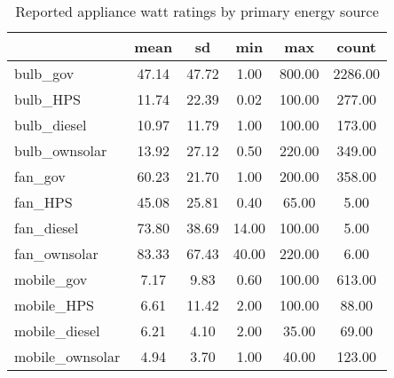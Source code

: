 \begin{table}[htbp]\centering
\caption{Reported appliance watt ratings by primary energy source\label {tab1}}
\begin{tabular}{l*{5}{c}}
\toprule
            &        mean&          sd&         min&         max&       count\\
\midrule
bulb\_gov    &       47.14&       47.72&        1.00&      800.00&     2286.00\\
bulb\_HPS    &       11.74&       22.39&        0.02&      100.00&      277.00\\
bulb\_diesel &       10.97&       11.79&        1.00&      100.00&      173.00\\
bulb\_ownsolar&       13.92&       27.12&        0.50&      220.00&      349.00\\
fan\_gov     &       60.23&       21.70&        1.00&      200.00&      358.00\\
fan\_HPS     &       45.08&       25.81&        0.40&       65.00&        5.00\\
fan\_diesel  &       73.80&       38.69&       14.00&      100.00&        5.00\\
fan\_ownsolar&       83.33&       67.43&       40.00&      220.00&        6.00\\
mobile\_gov  &        7.17&        9.83&        0.60&      100.00&      613.00\\
mobile\_HPS  &        6.61&       11.42&        2.00&      100.00&       88.00\\
mobile\_diesel&        6.21&        4.10&        2.00&       35.00&       69.00\\
mobile\_ownsolar&        4.94&        3.70&        1.00&       40.00&      123.00\\
\bottomrule
\end{tabular}
\end{table}

